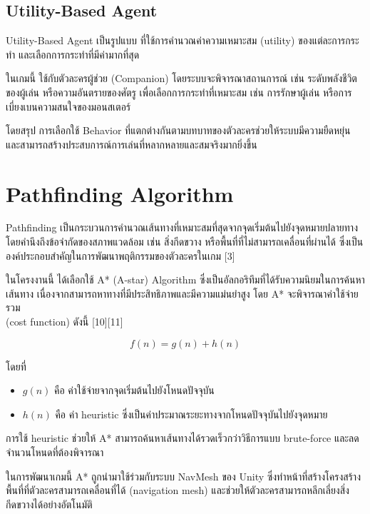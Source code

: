 \subsection{Utility-Based Agent}
\hspace{1.5em}Utility-Based Agent เป็นรูปแบบ ที่ใช้การคำนวณค่าความเหมาะสม (utility) ของแต่ละการกระทำ และเลือกการกระทำที่มีค่ามากที่สุด

ในเกมนี้ ใช้กับตัวละครผู้ช่วย (Companion) โดยระบบจะพิจารณาสถานการณ์ เช่น ระดับพลังชีวิตของผู้เล่น หรือความอันตรายของศัตรู เพื่อเลือกการกระทำที่เหมาะสม เช่น การรักษาผู้เล่น หรือการเบี่ยงเบนความสนใจของมอนสเตอร์

โดยสรุป การเลือกใช้ Behavior ที่แตกต่างกันตามบทบาทของตัวละครช่วยให้ระบบมีความยืดหยุ่น และสามารถสร้างประสบการณ์การเล่นที่หลากหลายและสมจริงมากยิ่งขึ้น

\section{Pathfinding Algorithm}
\hspace{1.5em}Pathfinding เป็นกระบวนการคำนวณเส้นทางที่เหมาะสมที่สุดจากจุดเริ่มต้นไปยังจุดหมายปลายทาง \\โดยคำนึงถึงข้อจำกัดของสภาพแวดล้อม เช่น สิ่งกีดขวาง หรือพื้นที่ที่ไม่สามารถเคลื่อนที่ผ่านได้ ซึ่งเป็นองค์ประกอบสำคัญในการพัฒนาพฤติกรรมของตัวละครในเกม [3]

ในโครงงานนี้ ได้เลือกใช้ A* (A-star) Algorithm ซึ่งเป็นอัลกอริทึมที่ได้รับความนิยมในการค้นหาเส้นทาง เนื่องจากสามารถหาทางที่มีประสิทธิภาพและมีความแม่นยำสูง โดย A* จะพิจารณาค่าใช้จ่ายรวม \\(cost function) ดังนี้ [10][11]

\[
f(n) = g(n) + h(n)
\]

โดยที่
\begin{itemize}
  \item $g(n)$ คือ ค่าใช้จ่ายจากจุดเริ่มต้นไปยังโหนดปัจจุบัน
  \item $h(n)$ คือ ค่า heuristic ซึ่งเป็นค่าประมาณระยะทางจากโหนดปัจจุบันไปยังจุดหมาย
\end{itemize}

การใช้ heuristic ช่วยให้ A* สามารถค้นหาเส้นทางได้รวดเร็วกว่าวิธีการแบบ brute-force และลด\\จำนวนโหนดที่ต้องพิจารณา

ในการพัฒนาเกมนี้ A* ถูกนำมาใช้ร่วมกับระบบ NavMesh ของ Unity ซึ่งทำหน้าที่สร้างโครงสร้างพื้นที่ที่ตัวละครสามารถเคลื่อนที่ได้ (navigation mesh) และช่วยให้ตัวละครสามารถหลีกเลี่ยงสิ่งกีดขวางได้อย่างอัตโนมัติ

